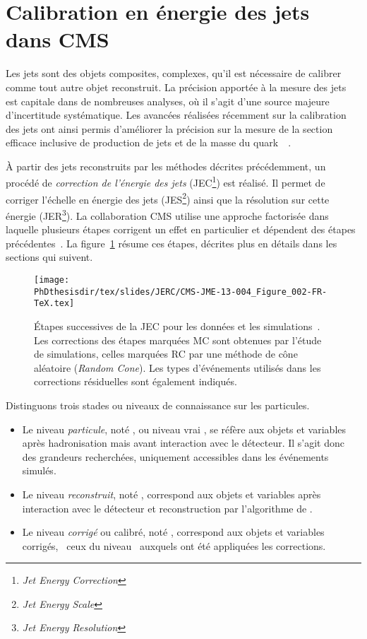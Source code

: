 \section{Calibration en énergie des jets dans CMS}\label{chapter-JERC-section-CMS}
Les jets sont des objets composites, complexes, qu'il est nécessaire de calibrer comme tout autre objet reconstruit.
La précision apportée à la mesure des jets est capitale dans de nombreuses analyses, où il s'agit d'une source majeure d'incertitude systématique.
Les avancées réalisées récemment sur la calibration des jets ont ainsi permis d'améliorer la précision sur la mesure de la section efficace inclusive de production de jets et de la masse du quark~\quarkt~\cite{JERC_RunI}.
\par À partir des jets reconstruits par les méthodes décrites précédemment, un procédé de \emph{correction de l'énergie des jets} (JEC\footnote{\emph{Jet Energy Correction}}) est réalisé.
Il permet de corriger l'échelle en énergie des jets (JES\footnote{\emph{Jet Energy Scale}}) ainsi que la résolution sur cette énergie (JER\footnote{\emph{Jet Energy Resolution}}).
La collaboration CMS utilise une approche factorisée dans laquelle plusieurs étapes corrigent un effet en particulier et dépendent des étapes précédentes~\cite{JERC_RunI}.
La figure~\ref{fig-CMS-JME-13-004_Figure_002-TeX} résume ces étapes, décrites plus en détails dans les sections qui suivent.
\begin{figure}[h]
\centering
\texttt{[image: \\PhDthesisdir/tex/slides/JERC/CMS-JME-13-004\_Figure\_002-FR-TeX.tex]}
\caption[Étapes successives de la JEC.]{Étapes successives de la JEC pour les données et les simulations~\cite{JERC_RunI}. Les corrections des étapes marquées \og MC \fg{} sont obtenues par l'étude de simulations, celles marquées \og RC \fg{} par une méthode de cône aléatoire (\emph{Random Cone}). Les types d'événements utilisés dans les corrections résiduelles sont également indiqués.}
\label{fig-CMS-JME-13-004_Figure_002-TeX}
\end{figure}
\par Distinguons trois stades ou \og niveaux \fg{} de connaissance sur les particules.
\begin{itemize}
\item Le niveau \emph{particule}, noté \ptcl, ou niveau \og vrai \fg{}, se réfère aux objets et variables après hadronisation mais avant interaction avec le détecteur. Il s'agit donc des grandeurs recherchées, uniquement accessibles dans les événements simulés.
\item Le niveau \emph{reconstruit}, noté \reco, correspond aux objets et variables après interaction avec le détecteur et reconstruction par l'algorithme de \PF.
\item Le niveau \emph{corrigé} ou calibré, noté \cali, correspond aux objets et variables corrigés, \ie\ ceux du niveau \reco\ auxquels ont été appliquées les corrections.
\end{itemize}
